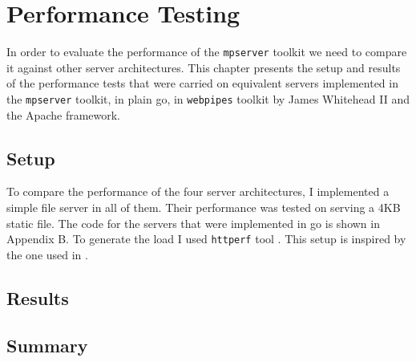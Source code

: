 \section{Performance Testing}
\label{sec:test}
In order to evaluate the performance of the \texttt{mpserver} toolkit we 
need to compare it against other server architectures.
This chapter presents the setup and results of the performance tests
that were carried on equivalent servers implemented in the \texttt{mpserver} toolkit,
in plain go, in \texttt{webpipes} toolkit by James Whitehead II 
\cite{whitehead} and the Apache framework.

\subsection{Setup}
To compare the performance of the four server architectures, I 
implemented a simple file server in all of them. Their performance 
was tested on serving a 4KB static file. The code for the servers 
that were implemented in go is shown in Appendix B. To generate 
the load I used \texttt{httperf} tool \cite{httperf}. This setup
is inspired by the one used in \cite{whitehead}.


\subsection{Results}

\subsection{Summary}

